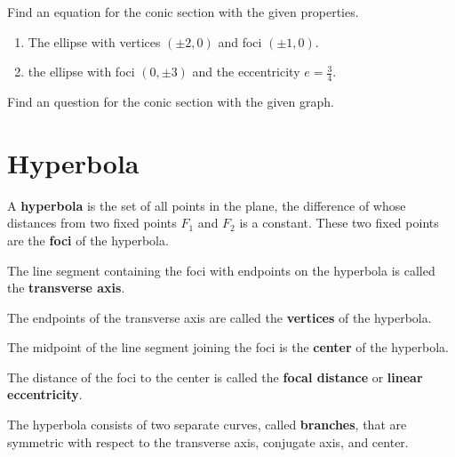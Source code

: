 \begin{exercise}
  Find an equation for the conic section with the given properties.
  \begin{enumerate}
      \item The ellipse with vertices $(\pm 2, 0)$ and foci $(\pm 1, 0)$.
      \item the ellipse with foci $(0,\pm 3)$ and the eccentricity $e=\frac34$.
  \end{enumerate}
  \end{exercise}
  
\newpage
  \begin{exercise}
      Find an question for the conic section with the given graph.\\
  \end{exercise}

\newpage

\section{Hyperbola}

\begin{definition}
A \textbf{hyperbola} is the set of all points in the plane, the difference of whose distances
from two fixed points $F_1$ and $F_2$ is a constant. These two
fixed points are the \textbf{foci} of the hyperbola.

The line segment containing the foci with endpoints on the hyperbola is called the \textbf{transverse axis}. 

The endpoints of the transverse axis are called the \textbf{vertices} of the hyperbola.

The midpoint of the line segment joining the foci is the \textbf{center} of the hyperbola.

The distance of the foci to the center is called the \textbf{focal distance} or \textbf{linear eccentricity}.

The hyperbola consists of two separate curves, called \textbf{branches}, that are symmetric with respect to the transverse axis, conjugate
axis, and center. 
\end{definition}


